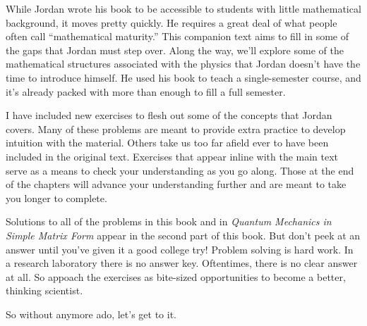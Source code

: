 While Jordan wrote his book to be accessible to students with little mathematical background, it moves pretty quickly. He requires a great deal of what people often call ``mathematical maturity.'' This companion text aims to fill in some of the gaps that Jordan must step over. Along the way, we'll explore some of the mathematical structures associated with the physics that Jordan doesn't have the time to introduce himself. He used his book to teach a single-semester course, and it's already packed with more than enough to fill a full semester.

I have included new exercises to flesh out some of the concepts that Jordan covers. Many of these problems are meant to provide extra practice to develop intuition with the material. Others take us too far afield ever to have been included in the original text. Exercises that appear inline with the main text serve as a means to check your understanding as you go along. Those at the end of the chapters will advance your understanding further and are meant to take you longer to complete.

Solutions to all of the problems in this book and in \emph{Quantum Mechanics in Simple Matrix Form} appear in the second part of this book. But don't peek at an answer until you've given it a good college try! Problem solving is hard work. In a research laboratory there is no answer key. Oftentimes, there is no clear answer at all. So appoach the exercises as bite-sized opportunities to become a better, thinking scientist.

So without anymore ado, let's get to it.
